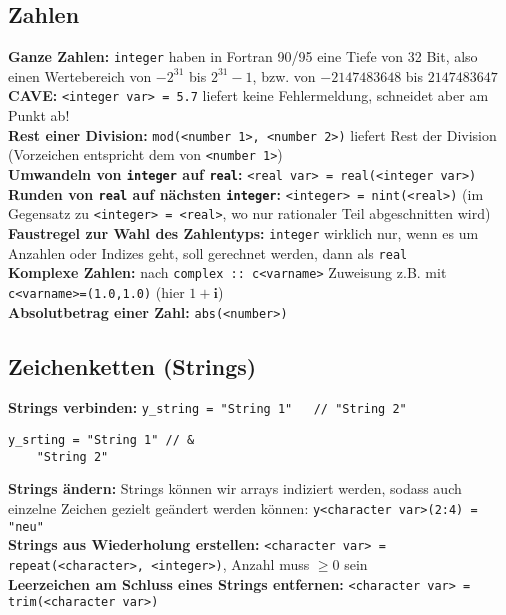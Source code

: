 \documentclass[a4paper, twocolumn]{scrarticle}
\begin{document}
  \subsection{Zahlen}
  \textbf{Ganze Zahlen:} \lstinline|integer| haben in Fortran 90/95 eine Tiefe von 32 Bit, also einen Wertebereich von $-2^{31}$ bis $2^{31}-1$, bzw. von $-2147483648$ bis $2147483647$\\
  \textbf{CAVE:} \lstinline|<integer var> = 5.7| liefert keine Fehlermeldung, schneidet aber am Punkt ab!\\
  \textbf{Rest einer Division:} \lstinline|mod(<number 1>, <number 2>)| liefert Rest der Division (Vorzeichen entspricht dem von \lstinline|<number 1>|) \\
  \textbf{Umwandeln von \lstinline|integer| auf \lstinline|real|:} \lstinline|<real var> = real(<integer var>)|\\
  \textbf{Runden von \lstinline|real| auf nächsten \lstinline|integer|:} \lstinline|<integer> = nint(<real>)| (im Gegensatz zu \lstinline|<integer> = <real>|, wo nur rationaler Teil abgeschnitten wird)\\
  \textbf{Faustregel zur Wahl des Zahlentyps:} \lstinline|integer| wirklich nur, wenn es um Anzahlen oder Indizes geht, soll gerechnet werden, dann als \lstinline|real|\\
  \textbf{Komplexe Zahlen:} nach \lstinline|complex :: c<varname>| Zuweisung z.B. mit \lstinline|c<varname>=(1.0,1.0)| (hier $1+\textbf{i}$)\\
  \textbf{Absolutbetrag einer Zahl:} \lstinline|abs(<number>)|
  \subsection{Zeichenketten (\glqq Strings\grqq)}
  \textbf{Strings verbinden:} \lstinline|y_string = "String 1"   // "String 2"|
  \begin{lstlisting}[caption={\bfseries String-Verkettung über Code-Zeilen hinweg},label=lst:stringkette]
    y_srting = "String 1" // &
    "String 2"
  \end{lstlisting}
  \textbf{Strings ändern:} Strings können wir arrays indiziert werden, sodass auch einzelne Zeichen gezielt geändert werden können: \lstinline|y<character var>(2:4) = "neu"|\\
  \textbf{Strings aus Wiederholung erstellen:} \lstinline|<character var> = repeat(<character>, <integer>)|, Anzahl muss $\geq 0$ sein\\
  \textbf{Leerzeichen am Schluss eines Strings entfernen:} \lstinline|<character var> = trim(<character var>)|\\
  
\end{document}
